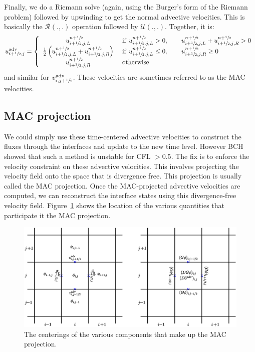 Finally, we do a Riemann solve (again, using the Burger's form of the
Riemann problem) followed by upwinding to get the normal advective
velocities.  This is basically the $\mathcal{R}(.,.)$ operation followed 
by $\mathcal{U}(.,.)$.  Together, it is:
\begin{equation}
u^\mathrm{adv}_{i+{\sfrac{1}{2}},j} = \left \{ \begin{array}{cl}
   u_{i+{\sfrac{1}{2}},j,L}^{n+{\sfrac{1}{2}}}  & 
         \mathrm{~if~} u_{i+{\sfrac{1}{2}},j,L}^{n+{\sfrac{1}{2}}} > 0, \qquad 
                       u_{i+{\sfrac{1}{2}},j,L}^{n+{\sfrac{1}{2}}} + u_{i+{\sfrac{1}{2}},j,R}^{n+{\sfrac{1}{2}}} > 0 \\
   \frac{1}{2} \left ( u_{i+{\sfrac{1}{2}},j,L}^{n+{\sfrac{1}{2}}} +
                       u_{i+{\sfrac{1}{2}},j,R}^{n+{\sfrac{1}{2}}} \right )  &
          \mathrm{~if~} u_{i+{\sfrac{1}{2}},j,L}^{n+{\sfrac{1}{2}}} \le 0, \qquad 
                        u_{i+{\sfrac{1}{2}},j,R}^{n+{\sfrac{1}{2}}} \ge 0 \\
   u_{i+{\sfrac{1}{2}},j,R}^{n+{\sfrac{1}{2}}}  & \mathrm{~otherwise}
  \end{array}
  \right .
\end{equation}
and similar for $v^\mathrm{adv}_{i,j+{\sfrac{1}{2}}}$.  
These velocities are sometimes referred to as the MAC velocities.


\subsection{MAC projection}

We could simply use these time-centered advective velocities to
construct the fluxes through the interfaces and update to the new time
level.  However BCH showed that such a method is unstable for CFL $>
0.5$.  The fix is to enforce the velocity constraint on these advective
velocities.  This involves projecting the velocity field onto the
space that is divergence free.  This projection is usually called the
MAC projection.  Once the MAC-projected advective velocities are
computed, we can reconstruct the interface states using this
divergence-free velocity field.  Figure~\ref{fig:incomp:MACsolve}
shows the location of the various quantities that participate
it the MAC projection.

\begin{figure}[t]
\centering
\includegraphics[width=\linewidth]{MAC_solve}
\caption[MAC grid data centerings] {\label{fig:incomp:MACsolve} The
  centerings of the various components that make up the MAC
  projection.}
\end{figure}

